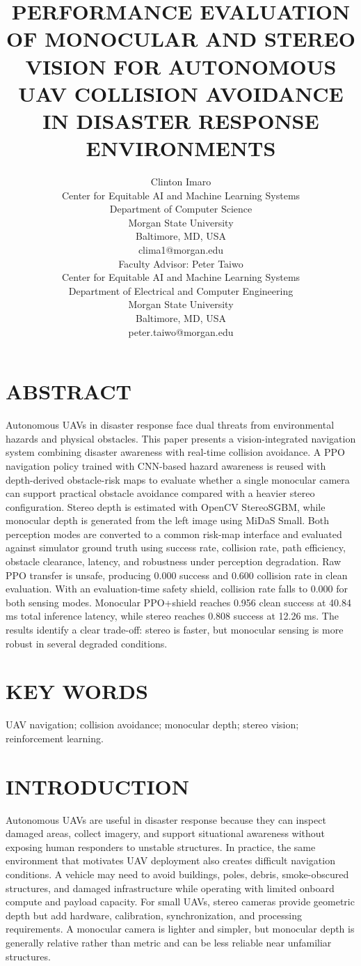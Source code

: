 \documentclass[12pt]{article}
\title{\Large \vspace{-0.5in}
\MakeUppercase{Performance Evaluation of Monocular and Stereo Vision for Autonomous UAV Collision Avoidance in Disaster Response Environments}}
\author{Clinton Imaro\\
    \normalsize Center for Equitable AI and Machine Learning Systems\\
    \normalsize Department of Computer Science\\
    \normalsize Morgan State University\\
    \normalsize Baltimore, MD, USA\\
    \normalsize clima1@morgan.edu\\[6pt]
    \normalsize Faculty Advisor: Peter Taiwo\\
    \normalsize Center for Equitable AI and Machine Learning Systems\\
    \normalsize Department of Electrical and Computer Engineering\\
    \normalsize Morgan State University\\
    \normalsize Baltimore, MD, USA\\
    \normalsize peter.taiwo@morgan.edu}
\date{}
\begin{document}
\maketitle

\section{\MakeUppercase{Abstract}}

\noindent
Autonomous UAVs in disaster response face dual threats from environmental hazards and physical obstacles. This paper presents a vision-integrated navigation system combining disaster awareness with real-time collision avoidance. A PPO navigation policy trained with CNN-based hazard awareness is reused with depth-derived obstacle-risk maps to evaluate whether a single monocular camera can support practical obstacle avoidance compared with a heavier stereo configuration. Stereo depth is estimated with OpenCV StereoSGBM, while monocular depth is generated from the left image using MiDaS Small. Both perception modes are converted to a common risk-map interface and evaluated against simulator ground truth using success rate, collision rate, path efficiency, obstacle clearance, latency, and robustness under perception degradation. Raw PPO transfer is unsafe, producing 0.000 success and 0.600 collision rate in clean evaluation. With an evaluation-time safety shield, collision rate falls to 0.000 for both sensing modes. Monocular PPO+shield reaches 0.956 clean success at 40.84 ms total inference latency, while stereo reaches 0.808 success at 12.26 ms. The results identify a clear trade-off: stereo is faster, but monocular sensing is more robust in several degraded conditions.

\section{\MakeUppercase{Key Words}}

\noindent
UAV navigation; collision avoidance; monocular depth; stereo vision; reinforcement learning.

\section{\MakeUppercase{Introduction}}

\noindent
Autonomous UAVs are useful in disaster response because they can inspect damaged areas, collect imagery, and support situational awareness without exposing human responders to unstable structures. In practice, the same environment that motivates UAV deployment also creates difficult navigation conditions. A vehicle may need to avoid buildings, poles, debris, smoke-obscured structures, and damaged infrastructure while operating with limited onboard compute and payload capacity. For small UAVs, stereo cameras provide geometric depth but add hardware, calibration, synchronization, and processing requirements. A monocular camera is lighter and simpler, but monocular depth is generally relative rather than metric and can be less reliable near unfamiliar structures.
\end{document}
